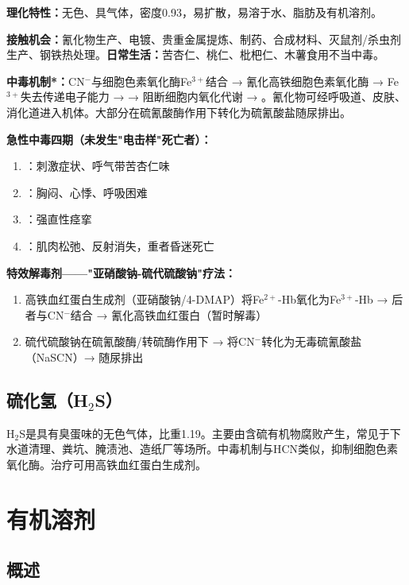 \begin{keybox}
\textbf{理化特性：}无色、具气体，密度0.93，易扩散，易溶于水、脂肪及有机溶剂。

\textbf{接触机会：}氰化物生产、电镀、贵重金属提炼、制药、合成材料、灭鼠剂/杀虫剂生产、钢铁热处理。\textbf{日常生活：}苦杏仁、桃仁、枇杷仁、木薯食用不当中毒。

\textbf{中毒机制*：}CN$^-$与细胞色素氧化酶Fe$^{3+}$结合 → 氰化高铁细胞色素氧化酶 → Fe$^{3+}$失去传递电子能力 → → 阻断细胞内氧化代谢 → 。氰化物可经呼吸道、皮肤、消化道进入机体。大部分在硫氰酸酶作用下转化为硫氰酸盐随尿排出。

\textbf{急性中毒四期（未发生"电击样"死亡者）：}
\begin{enumerate}[leftmargin=*]
    \item {}：刺激症状、呼气带苦杏仁味
    \item {}：胸闷、心悸、呼吸困难
    \item {}：强直性痉挛
    \item {}：肌肉松弛、反射消失，重者昏迷死亡
\end{enumerate}

\textbf{特效解毒剂——"亚硝酸钠-硫代硫酸钠"疗法：}
\begin{enumerate}[leftmargin=*]
    \item 高铁血红蛋白生成剂（亚硝酸钠/4-DMAP）将Fe$^{2+}$-Hb氧化为Fe$^{3+}$-Hb → 后者与CN$^-$结合 → 氰化高铁血红蛋白（暂时解毒）
    \item 硫代硫酸钠在硫氰酸酶/转硫酶作用下 → 将CN$^-$转化为无毒硫氰酸盐（NaSCN）→ 随尿排出
\end{enumerate}
\end{keybox}

\subsection{硫化氢（H$_2$S）}

H$_2$S是具有臭蛋味的无色气体，比重1.19。主要由含硫有机物腐败产生，常见于下水道清理、粪坑、腌渍池、造纸厂等场所。中毒机制与HCN类似，抑制细胞色素氧化酶。治疗可用高铁血红蛋白生成剂。

\section{有机溶剂}

\subsection{概述}

